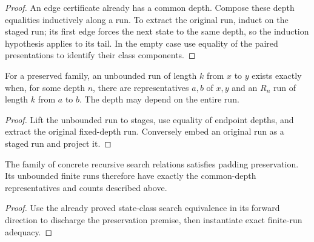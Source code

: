 \begin{proof}
An edge certificate already has a common depth. Compose these depth equalities inductively along a run. To extract the original run, induct on the staged run; its first edge forces the next state to the same depth, so the induction hypothesis applies to its tail. In the empty case use equality of the paired presentations to identify their class components.
\end{proof}






\begin{lemma}
For a preserved family, an unbounded run of length $k$ from $x$ to $y$ exists exactly when, for some depth $n$, there are representatives $a,b$ of $x,y$ and an $R_n$ run of length $k$ from $a$ to $b$. The depth may depend on the entire run.
\end{lemma}

\begin{proof}
Lift the unbounded run to stages, use equality of endpoint depths, and extract the original fixed-depth run. Conversely embed an original run as a staged run and project it.
\end{proof}



\begin{lemma}
The family of concrete recursive search relations satisfies padding preservation. Its unbounded finite runs therefore have exactly the common-depth representatives and counts described above.
\end{lemma}

\begin{proof}
Use the already proved state-class search equivalence in its forward direction to discharge the preservation premise, then instantiate exact finite-run adequacy.
\end{proof}


